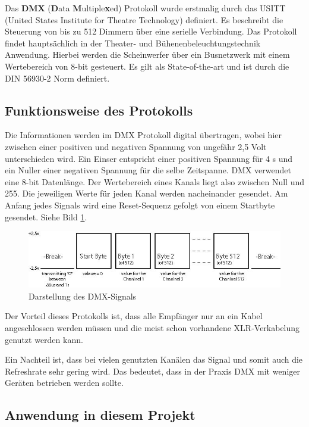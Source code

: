 Das \textbf{DMX} (\textbf{D}ata \textbf{M}ultiple\textbf{x}ed) Protokoll
wurde erstmalig durch das USITT (United States Institute for Theatre
Technology) definiert. Es beschreibt die Steuerung von bis zu 512
Dimmern über eine serielle Verbindung. Das Protokoll findet
hauptsächlich in der Theater- und Bühenenbeleuchtungstechnik Anwendung.
Hierbei werden die Scheinwerfer über ein Busnetzwerk mit einem
Wertebereich von 8-bit gesteuert. Es gilt als State-of-the-art und ist
durch die DIN 56930-2 Norm definiert.\cite{dmx512/1990}

\hypertarget{funktionsweise-des-protokolls}{%
\subsection{Funktionsweise des
Protokolls}\label{funktionsweise-des-protokolls}}

Die Informationen werden im DMX Protokoll digital übertragen, wobei hier
zwischen einer positiven und negativen Spannung von ungefähr 2,5 Volt
unterschieden wird. Ein Einser entspricht einer positiven Spannung für 4
\textmu s und ein Nuller einer negativen Spannung für die selbe
Zeitspanne. DMX verwendet eine 8-bit Datenlänge. Der Wertebereich eines
Kanals liegt also zwischen Null und 255. Die jeweiligen Werte für jeden
Kanal werden nacheinander gesendet. Am Anfang jedes Signals wird eine
Reset-Sequenz gefolgt von einem Startbyte gesendet.\cite{dmx-1} Siehe
Bild \ref{dmx-signal}.

\begin{figure}
\centering
\includegraphics{bilder/Clemens/dmx.jpg}
\caption{Darstellung des DMX-Signals\label{dmx-signal}}
\end{figure}

Der Vorteil dieses Protokolls ist, dass alle Empfänger nur an ein Kabel
angeschlossen werden müssen und die meist schon vorhandene
XLR-Verkabelung genutzt werden kann.\cite{dmx512/1990}

Ein Nachteil ist, dass bei vielen genutzten Kanälen das Signal und somit
auch die Refreshrate sehr gering wird. Das bedeutet, dass in der Praxis
DMX mit weniger Geräten betrieben werden sollte.\cite{dmx512/1990}

\hypertarget{anwendung-in-diesem-projekt}{%
\subsection{Anwendung in diesem
Projekt}\label{anwendung-in-diesem-projekt}}

